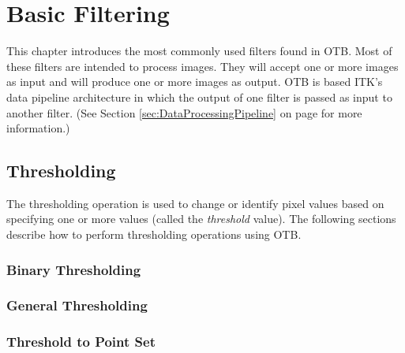 \chapter{Basic Filtering}


This chapter introduces the most commonly used filters found in OTB.
Most of these filters are intended to process images. They will accept one or
more images as input and will produce one or more images as output. OTB is
based ITK's data pipeline architecture in which the output of one filter is
passed as input to another filter. (See Section
\ref{sec:DataProcessingPipeline} on page \pageref{sec:DataProcessingPipeline}
for more information.)


\section{Thresholding}
\ifitkFullVersion
\label{sec:ThresholdingFiltering}
\fi

The thresholding operation is used to change or identify pixel values based
on specifying one or more values (called the \emph{threshold} value). The
following sections describe how to perform thresholding operations using
OTB.

\subsection{Binary Thresholding}
\label{sec:BinaryThresholdingImageFilter}

\ifitkFullVersion

\fi

\subsection{General Thresholding}
\label{sec:ThresholdingImageFilter}

\ifitkFullVersion

\fi

\subsection{Threshold to Point Set}
\label{sec:ThresholdImageToPointSetFilter}

\ifitkFullVersion

\fi



